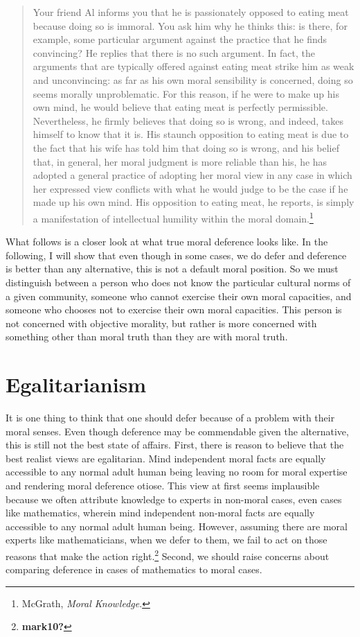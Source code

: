 \documentclass[
  12pt,
]{book}
\theoremstyle{definition}
\theoremstyle{definition}
\theoremstyle{definition}
\theoremstyle{definition}
\theoremstyle{remark}
\begin{document}
\begin{quote}
Your friend Al informs you that he is passionately opposed to eating meat because doing so is immoral. You ask him why he thinks this: is there, for example, some particular argument against the practice that he finds convincing? He replies that there is no such argument. In fact, the arguments that are typically offered against eating meat strike him as weak and unconvincing: as far as his own moral sensibility is concerned, doing so seems morally unproblematic. For this reason, if he were to make up his own mind, he would believe that eating meat is perfectly permissible. Nevertheless, he firmly believes that doing so is wrong, and indeed, takes himself to know that it is. His staunch opposition to eating meat is due to the fact that his wife has told him that doing so is wrong, and his belief that, in general, her moral judgment is more reliable than his, he has adopted a general practice of adopting her moral view in any case in which her expressed view conflicts with what he would judge to be the case if he made up his own mind. His opposition to eating meat, he reports, is simply a manifestation of intellectual humility within the moral domain.\footnote{McGrath, \emph{Moral {Knowledge}}.}
\end{quote}

What follows is a closer look at what true moral deference looks like. In the following, I will show that even though in some cases, we do defer and deference is better than any alternative, this is not a default moral position. So we must distinguish between a person who does not know the particular cultural norms of a given community, someone who cannot exercise their own moral capacities, and someone who chooses not to exercise their own moral capacities. This person is not concerned with objective morality, but rather is more concerned with something other than moral truth than they are with moral truth.

\section{Egalitarianism}\label{egalitarianism}

It is one thing to think that one should defer because of a problem with their moral senses. Even though deference may be commendable given the alternative, this is still not the best state of affairs. First, there is reason to believe that the best realist views are egalitarian. Mind independent moral facts are equally accessible to any normal adult human being leaving no room for moral expertise and rendering moral deference otiose. This view at first seems implausible because we often attribute knowledge to experts in non-moral cases, even cases like mathematics, wherein mind independent non-moral facts are equally accessible to any normal adult human being. However, assuming there are moral experts like mathematicians, when we defer to them, we fail to act on those reasons that make the action right.\footnote{\textbf{mark10?}} Second, we should raise concerns about comparing deference in cases of mathematics to moral cases.
\end{document}
